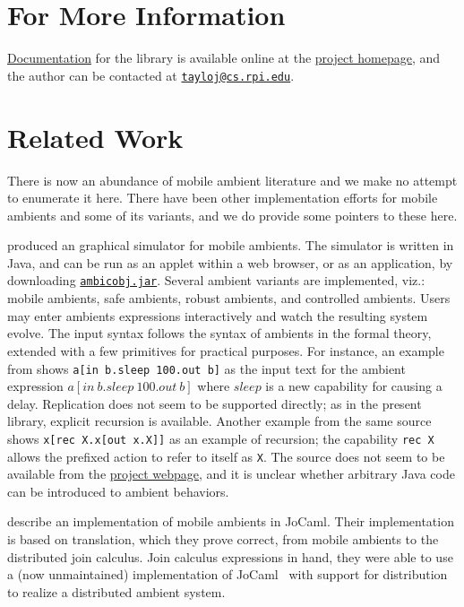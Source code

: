 \documentclass[12pt]{article}
\begin{document}
\section{For More Information}
\label{sec:for-more-information}

\href{https://svn.cs.rpi.edu/svn/tayloj/mobile-ambients/doc/index.html}{Documentation} for the library is available online at the \href{http://www.cs.rpi.edu/~tayloj/mobile-ambients/}{project homepage}, and the author can be contacted at \href{mailto:tayloj@cs.rpi.edu}{\texttt{tayloj@cs.rpi.edu}}.

\section{Related Work}
\label{sec:related-work}

There is now an abundance of mobile ambient literature and we make no attempt to enumerate it here.
There have been other implementation efforts for mobile ambients and some of its variants, and we do provide some pointers to these here.

 produced an graphical simulator for mobile ambients.
The simulator is written in Java, and can be run as an applet within  a web browser, or as an application, by downloading 
\href{http://www-sop.inria.fr/mimosa/ambicobjs/ambicobj.jar}{\texttt{ambicobj.jar}}.
Several ambient variants are implemented, viz.: mobile ambients, safe ambients, robust ambients, and controlled ambients.
Users may enter ambients expressions interactively and watch the resulting system evolve.
The input syntax follows the syntax of ambients in the formal theory, extended with a few primitives for practical purposes.
For instance, an example from  shows \texttt{a[in~b.sleep~100.out~b]} as the input text for the ambient expression $a[\mathit{in}\ b.\mathit{sleep}\ 100.\mathit{out}\ b]$ where $\mathit{sleep}$ is a new capability for causing a delay.
Replication does not seem to be supported directly; 
as in the present library, explicit recursion is available.
Another example from the same source shows \texttt{x[rec~X.x[out~x.X]]} as an example of recursion;
the capability \texttt{rec~X} allows the prefixed action to refer to itself as \texttt{X}.
The source does not seem to be available from the \href{http://www-sop.inria.fr/mimosa/ambicobjs/}{project webpage}, and it is unclear whether arbitrary Java code can be introduced to ambient behaviors.

 describe an implementation of mobile ambients in JoCaml.
Their implementation is based on translation, which they prove correct, from mobile ambients to the distributed join calculus.
Join calculus expressions in hand, they were able to use a (now unmaintained) implementation of JoCaml~\cite{Conchon:1999} with support for distribution to realize a distributed ambient system.



\end{document}
